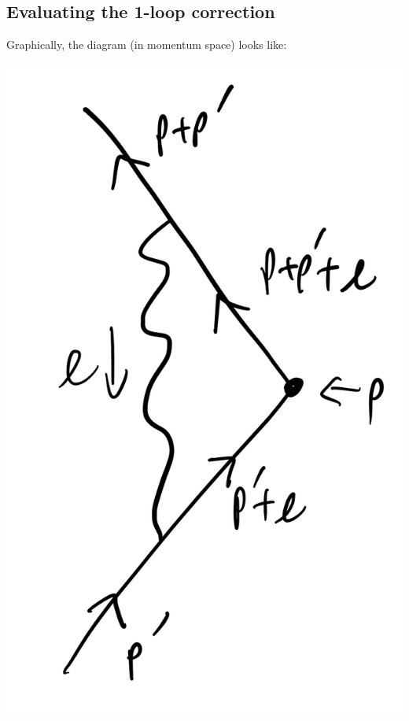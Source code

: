 \subsection{Evaluating the 1-loop correction}
Graphically, the diagram (in momentum space) looks like:
\begin{center}
    \includegraphics[scale=0.35]{Lectures/Images/lec10-momenta.png}
\end{center}

